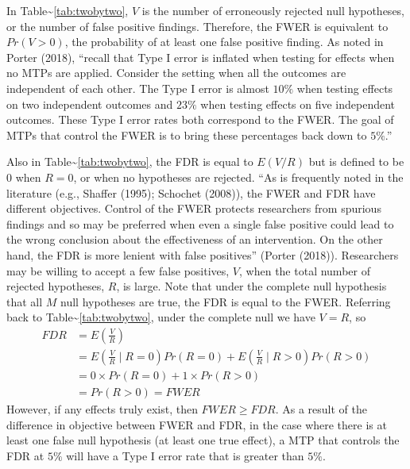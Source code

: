 \documentclass[
]{article}
\begin{document}
In Table\textasciitilde{}\ref{tab:twobytwo}, \(V\) is the number of
erroneously rejected null hypotheses, or the number of false positive
findings. Therefore, the FWER is equivalent to \(Pr(V > 0)\), the
probability of at least one false positive finding. As noted in Porter
(2018), ``recall that Type I error is inflated when testing for effects
when no MTPs are applied. Consider the setting when all the outcomes are
independent of each other. The Type I error is almost \(10\%\) when
testing effects on two independent outcomes and \(23\%\) when testing
effects on five independent outcomes. These Type I error rates both
correspond to the FWER. The goal of MTPs that control the FWER is to
bring these percentages back down to \(5\%\).''

Also in Table\textasciitilde{}\ref{tab:twobytwo}, the FDR is equal to
\(E(V/R)\) but is defined to be \(0\) when \(R=0\), or when no
hypotheses are rejected. ``As is frequently noted in the literature
(e.g., Shaffer (1995); Schochet (2008)), the FWER and FDR have different
objectives. Control of the FWER protects researchers from spurious
findings and so may be preferred when even a single false positive could
lead to the wrong conclusion about the effectiveness of an intervention.
On the other hand, the FDR is more lenient with false positives''
(Porter (2018)). Researchers may be willing to accept a few false
positives, \(V\), when the total number of rejected hypotheses, \(R\),
is large. Note that under the complete null hypothesis that all \(M\)
null hypotheses are true, the FDR is equal to the FWER. Referring back
to Table\textasciitilde{}\ref{tab:twobytwo}, under the complete null we
have \(V = R\), so \begin{align*}
FDR &= E\left(\frac{V}{R}\right)\\
&=  E\left(\frac{V}{R}\mid R = 0\right) Pr(R = 0) + E\left(\frac{V}{R} \mid R > 0\right)Pr(R > 0) \\
&= 0 \times Pr(R = 0) + 1 \times Pr(R > 0) \\
&= Pr(R > 0) = FWER
\end{align*} However, if any effects truly exist, then
\(FWER \geq FDR\). As a result of the difference in objective between
FWER and FDR, in the case where there is at least one false null
hypothesis (at least one true effect), a MTP that controls the FDR at
\(5\%\) will have a Type I error rate that is greater than \(5\%\).
\end{document}
